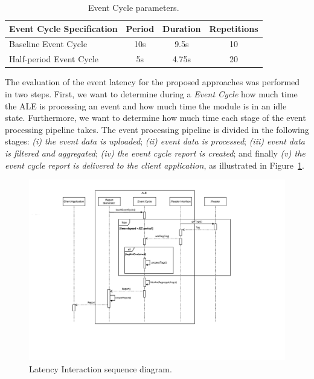 \begin{table}[ht!]
 \begin{tabular}{|l|c|c|c|}
  \hline
  Event Cycle Specification & Period  & Duration & Repetitions \\ \hline
  Baseline Event Cycle      &  10s    & 9.5s     & 10          \\ \hline
  Half-period Event Cycle   &   5s    & 4.75s    & 20          \\ \hline
 \end{tabular}
 \caption[Event Cycle parameters.]{Event Cycle parameters.}
 \label{table:ecspec_parameters}
\end{table}

The evaluation of the event latency for the proposed approaches was performed in two steps. First,
we want to determine during a \textit{Event Cycle} how much time the \gls{ALE} is processing an event
and how much time the module is in an idle state. Furthermore, we want to determine how much time
each stage of the event processing pipeline takes. The event processing pipeline is divided in the
following stages: \textit{(i) the event data is uploaded}; \textit{(ii) event data is processed};
\textit{(iii) event data is filtered and aggregated}; \textit{(iv) the event cycle report is created};
and finally \textit{(v) the event cycle report is delivered to the client application}, as
illustrated in Figure~\ref{fig:latency_seq_diagram}.

\begin{figure}[ht!]
  \centering
  \includegraphics[width=\textwidth]{./images/latency_interaction_seq_diagram}
  \caption[Latency Interaction sequence diagram.]{Latency Interaction sequence diagram.}
  \label{fig:latency_seq_diagram}
\end{figure}

